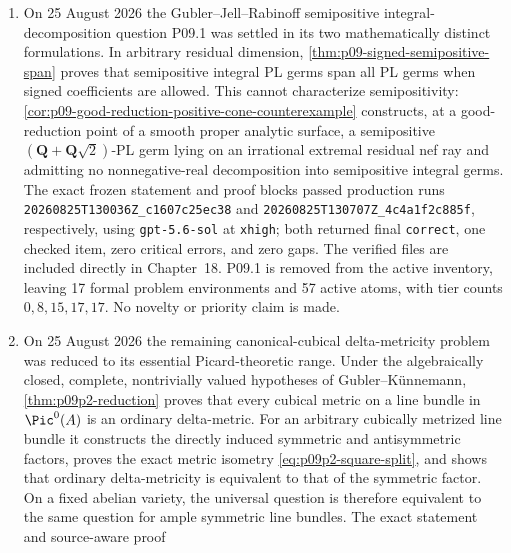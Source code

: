 \begin{enumerate}
  are integrated in Chapter~15 and the consequences are recorded in
  Chapters~70 and~72.  This settles the three unconditional universal
  assertions but does not solve the original classification problem.  The
  latter remains displayed, beginning with normal and analytically unibranch
  domains, so the inventory has 17 formal problem environments and 58 active
  atoms.  No positive classification, and no novelty or priority claim, is
  made.
\item On 25 August 2026 the Gubler--Jell--Rabinoff semipositive
  integral-decomposition question P09.1 was settled in its two mathematically
  distinct formulations.  In arbitrary residual dimension,
  \cref{thm:p09-signed-semipositive-span} proves that semipositive integral
  PL germs span all PL germs when signed coefficients are allowed.  This
  cannot characterize semipositivity:
  \cref{cor:p09-good-reduction-positive-cone-counterexample} constructs, at
  a good-reduction point of a smooth proper analytic surface, a semipositive
  \((\mathbf Q+\mathbf Q\sqrt2)\)-PL germ lying on an irrational extremal
  residual nef ray and admitting no nonnegative-real decomposition into
  semipositive integral germs.  The exact frozen statement and proof blocks
  passed production runs
  \texttt{20260825T130036Z\_c1607c25ec38} and
  \texttt{20260825T130707Z\_4c4a1f2c885f}, respectively, using
  \texttt{gpt-5.6-sol} at \texttt{xhigh}; both returned final
  \texttt{correct}, one checked item, zero critical errors, and zero gaps.
  The verified files are included directly in Chapter~18.  P09.1 is removed
  from the active inventory, leaving 17 formal problem environments and 57
  active atoms, with tier counts \(0,8,15,17,17\).  No novelty or priority
  claim is made.
\item On 25 August 2026 the remaining canonical-cubical
  delta-metricity problem was reduced to its essential Picard-theoretic
  range.  Under the algebraically closed, complete, nontrivially valued
  hypotheses of Gubler--K\"unnemann,
  \cref{thm:p09p2-reduction} proves that every cubical metric on a line
  bundle in \(\Pic^0(A)\) is an ordinary delta-metric.  For an arbitrary
  cubically metrized line bundle it constructs the directly induced
  symmetric and antisymmetric factors, proves the exact metric isometry
  \eqref{eq:p09p2-square-split}, and shows that ordinary delta-metricity is
  equivalent to that of the symmetric factor.  On a fixed abelian variety,
  the universal question is therefore equivalent to the same question for
  ample symmetric line bundles.  The exact statement and source-aware proof

\end{enumerate}
